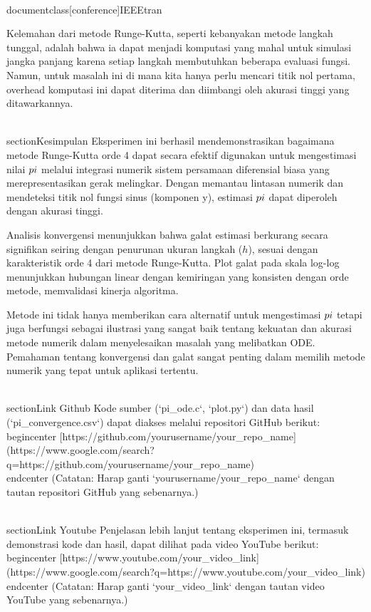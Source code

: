 \\documentclass[conference]{IEEEtran}
\begin{document}
Kelemahan dari metode Runge-Kutta, seperti kebanyakan metode langkah tunggal, adalah bahwa ia dapat menjadi komputasi yang mahal untuk simulasi jangka panjang karena setiap langkah membutuhkan beberapa evaluasi fungsi. Namun, untuk masalah ini di mana kita hanya perlu mencari titik nol pertama, overhead komputasi ini dapat diterima dan diimbangi oleh akurasi tinggi yang ditawarkannya.

\\section{Kesimpulan}
Eksperimen ini berhasil mendemonstrasikan bagaimana metode Runge-Kutta orde 4 dapat secara efektif digunakan untuk mengestimasi nilai $\\pi$ melalui integrasi numerik sistem persamaan diferensial biasa yang merepresentasikan gerak melingkar. Dengan memantau lintasan numerik dan mendeteksi titik nol fungsi sinus (komponen y), estimasi $\\pi$ dapat diperoleh dengan akurasi tinggi.

Analisis konvergensi menunjukkan bahwa galat estimasi berkurang secara signifikan seiring dengan penurunan ukuran langkah ($h$), sesuai dengan karakteristik orde 4 dari metode Runge-Kutta. Plot galat pada skala log-log menunjukkan hubungan linear dengan kemiringan yang konsisten dengan orde metode, memvalidasi kinerja algoritma.

Metode ini tidak hanya memberikan cara alternatif untuk mengestimasi $\\pi$ tetapi juga berfungsi sebagai ilustrasi yang sangat baik tentang kekuatan dan akurasi metode numerik dalam menyelesaikan masalah yang melibatkan ODE. Pemahaman tentang konvergensi dan galat sangat penting dalam memilih metode numerik yang tepat untuk aplikasi tertentu.

\\section{Link Github}
Kode sumber (`pi_ode.c`, `plot.py`) dan data hasil (`pi_convergence.csv`) dapat diakses melalui repositori GitHub berikut:
\\begin{center}
[https://github.com/yourusername/your\_repo\_name](https://www.google.com/search?q=https://github.com/yourusername/your_repo_name)
\\end{center}
(Catatan: Harap ganti `yourusername/your_repo_name` dengan tautan repositori GitHub yang sebenarnya.)

\\section{Link Youtube}
Penjelasan lebih lanjut tentang eksperimen ini, termasuk demonstrasi kode dan hasil, dapat dilihat pada video YouTube berikut:
\\begin{center}
[https://www.youtube.com/your\_video\_link](https://www.google.com/search?q=https://www.youtube.com/your_video_link)
\\end{center}
(Catatan: Harap ganti `your_video_link` dengan tautan video YouTube yang sebenarnya.)
\end{document}
